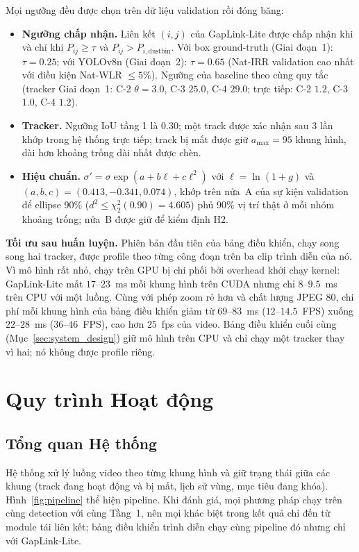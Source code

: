 Mọi ngưỡng đều được chọn trên dữ liệu validation rồi đóng băng:
\begin{itemize}
    \item \textbf{Ngưỡng chấp nhận.} Liên kết $(i,j)$ của GapLink-Lite được chấp nhận khi và chỉ khi $P_{ij} \ge \tau$ và $P_{ij} > P_{i,\text{dustbin}}$. Với box ground-truth (Giai đoạn~1): $\tau = 0.25$; với YOLOv8n (Giai đoạn~2): $\tau = 0.65$ (Nat-IRR validation cao nhất với điều kiện Nat-WLR $\le 5\%$). Ngưỡng của baseline theo cùng quy tắc (tracker Giai đoạn~1: C-2 $\theta=3.0$, C-3 $25.0$, C-4 $29.0$; trực tiếp: C-2 $1.2$, C-3 $1.0$, C-4 $1.2$).
    \item \textbf{Tracker.} Ngưỡng IoU tầng 1 là $0.30$; một track được xác nhận sau $3$ lần khớp trong hệ thống trực tiếp; track bị mất được giữ $a_{\max} = 95$ khung hình, dài hơn khoảng trống dài nhất được chèn.
    \item \textbf{Hiệu chuẩn.} $\sigma' = \sigma \exp(a + b\ell + c\ell^2)$ với $\ell = \ln(1+g)$ và $(a,b,c) = (0.413, -0.341, 0.074)$, khớp trên nửa~A của sự kiện validation để ellipse 90\% ($d^2 \le \chi^2_2(0.90) = 4.605$) phủ 90\% vị trí thật ở mỗi nhóm khoảng trống; nửa~B được giữ để kiểm định H2.
\end{itemize}

\textbf{Tối ưu sau huấn luyện.} Phiên bản đầu tiên của bảng điều khiển, chạy song song hai tracker, được profile theo từng công đoạn trên ba clip trình diễn của nó. Vì mô hình rất nhỏ, chạy trên GPU bị chi phối bởi overhead khởi chạy kernel: GapLink-Lite mất $17$--$23$~ms mỗi khung hình trên CUDA nhưng chỉ $8$--$9.5$~ms trên CPU với một luồng. Cùng với phép zoom rẻ hơn và chất lượng JPEG $80$, chi phí mỗi khung hình của bảng điều khiển giảm từ $69$--$83$~ms ($12$--$14.5$~FPS) xuống $22$--$28$~ms ($36$--$46$~FPS), cao hơn $25$~fps của video. Bảng điều khiển cuối cùng (Mục~\ref{sec:system_design}) giữ mô hình trên CPU và chỉ chạy một tracker thay vì hai; nó không được profile riêng.

\section{Quy trình Hoạt động}
\label{sec:workflow}

\subsection{Tổng quan Hệ thống}
\label{sec:system_overview}

Hệ thống xử lý luồng video theo từng khung hình và giữ trạng thái giữa các khung (track đang hoạt động và bị mất, lịch sử vùng, mục tiêu đang khóa). Hình~\ref{fig:pipeline} thể hiện pipeline. Khi đánh giá, mọi phương pháp chạy trên cùng detection với cùng Tầng~1, nên mọi khác biệt trong kết quả chỉ đến từ module tái liên kết; bảng điều khiển trình diễn chạy cùng pipeline đó nhưng chỉ với GapLink-Lite.


